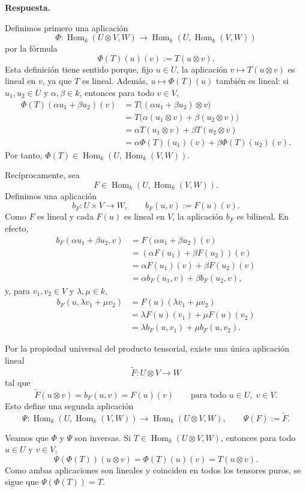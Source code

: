 \documentclass[10pt,a4paper]{article}
\newcommand{\Hom}{\operatorname{Hom}}
\newcommand{\inlinehead}[2][repblue]{%
  \par\smallskip
  {\color{#1}\bfseries #2.}\hspace{0.45em}%
}
\newcommand{\answer}{\inlinehead{Respuesta}}
\begin{document}
\answer
Definimos primero una aplicación
\[
  \Phi\colon \Hom_k(U\otimes V,W) \to \Hom_k(U,\Hom_k(V,W))
\]
por la fórmula
\[
  \Phi(T)(u)(v):=T(u\otimes v).
\]
Esta definición tiene sentido porque, fijo $u\in U$, la aplicación
$v\mapsto T(u\otimes v)$ es lineal en $v$, ya que $T$ es lineal. Además,
$u\mapsto \Phi(T)(u)$ también es lineal: si $u_1,u_2\in U$ y
$\alpha,\beta\in k$, entonces para todo $v\in V$,
\begin{align*}
  \Phi(T)(\alpha u_1+\beta u_2)(v)
  &=T\bigl((\alpha u_1+\beta u_2)\otimes v\bigr) \\
  &=T\bigl(\alpha(u_1\otimes v)+\beta(u_2\otimes v)\bigr) \\
  &=\alpha T(u_1\otimes v)+\beta T(u_2\otimes v) \\
  &=\alpha\Phi(T)(u_1)(v)+\beta\Phi(T)(u_2)(v).
\end{align*}
Por tanto, $\Phi(T)\in \Hom_k(U,\Hom_k(V,W))$.

Recíprocamente, sea
\[
  F\in \Hom_k(U,\Hom_k(V,W)).
\]
Definimos una aplicación
\[
  b_F\colon U\times V\to W,
  \qquad
  b_F(u,v):=F(u)(v).
\]
Como $F$ es lineal y cada $F(u)$ es lineal en $V$, la aplicación $b_F$ es
bilineal. En efecto,
\begin{align*}
  b_F(\alpha u_1+\beta u_2,v)
  &=F(\alpha u_1+\beta u_2)(v) \\
  &=(\alpha F(u_1)+\beta F(u_2))(v) \\
  &=\alpha F(u_1)(v)+\beta F(u_2)(v) \\
  &=\alpha b_F(u_1,v)+\beta b_F(u_2,v),
\end{align*}
y, para $v_1,v_2\in V$ y $\lambda,\mu\in k$,
\begin{align*}
  b_F(u,\lambda v_1+\mu v_2)
  &=F(u)(\lambda v_1+\mu v_2) \\
  &=\lambda F(u)(v_1)+\mu F(u)(v_2) \\
  &=\lambda b_F(u,v_1)+\mu b_F(u,v_2).
\end{align*}

Por la propiedad universal del producto tensorial, existe una única aplicación
lineal
\[
  \widetilde{F}\colon U\otimes V\to W
\]
tal que
\[
  \widetilde{F}(u\otimes v)=b_F(u,v)=F(u)(v)
  \qquad
  \text{para todo }u\in U,\;v\in V.
\]
Esto define una segunda aplicación
\[
  \Psi\colon \Hom_k(U,\Hom_k(V,W))\to \Hom_k(U\otimes V,W),
  \qquad
  \Psi(F):=\widetilde{F}.
\]

Veamos que $\Phi$ y $\Psi$ son inversas. Si $T\in \Hom_k(U\otimes V,W)$,
entonces para todo $u\in U$ y $v\in V$,
\[
  \Psi(\Phi(T))(u\otimes v)=\Phi(T)(u)(v)=T(u\otimes v).
\]
Como ambas aplicaciones son lineales y coinciden en todos los tensores puros,
se sigue que $\Psi(\Phi(T))=T$.
\end{document}
